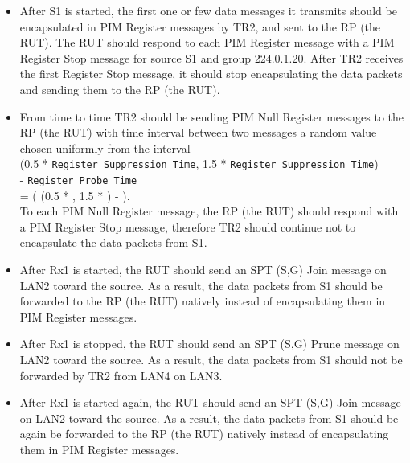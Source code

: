 \documentclass[11pt]{report}
\begin{document}
\begin{itemize}

  \item After S1 is started, the first one or few data messages it transmits
  should be encapsulated in PIM Register messages by TR2, and sent to the RP
  (the RUT). The RUT should respond to each PIM Register message with a PIM
  Register Stop message for source S1 and group 224.0.1.20. After TR2 receives
  the first Register Stop message, it should stop encapsulating the data
  packets and sending them to the RP (the RUT).

  \item From time to time TR2 should be sending PIM Null Register
  messages to the RP (the RUT) with time interval between two messages a random
  value chosen uniformly from the interval \\
  (0.5 * \verb=Register_Suppression_Time=,
  1.5 * \verb=Register_Suppression_Time=) \\
  - \verb=Register_Probe_Time= \\
  = ( (0.5 * {\PimsmRegisterSuppressionTime}, 1.5 *
  {\PimsmRegisterSuppressionTime}) - {\PimsmRegisterProbeTime} ). \\
  To each PIM Null Register message, the RP (the RUT) should respond with a
  PIM Register Stop message, therefore TR2 should continue not to
  encapsulate the data packets from S1.

  \item After Rx1 is started, the RUT should send an SPT (S,G) Join message
  on LAN2 toward the source. As a result, the data packets from S1 should be
  forwarded to the RP (the RUT) natively instead of encapsulating them in PIM
  Register messages.

  \item After Rx1 is stopped, the RUT should send an SPT (S,G) Prune message
  on LAN2 toward the source. As a result, the data packets from S1 should not
  be forwarded by TR2 from LAN4 on LAN3.

  \item After Rx1 is started again, the RUT should send an SPT (S,G) Join
  message on LAN2 toward the source. As a result, the data packets from S1
  should be again be forwarded to the RP (the RUT) natively instead of
  encapsulating them in PIM Register messages.

\end{itemize}

\end{document}
